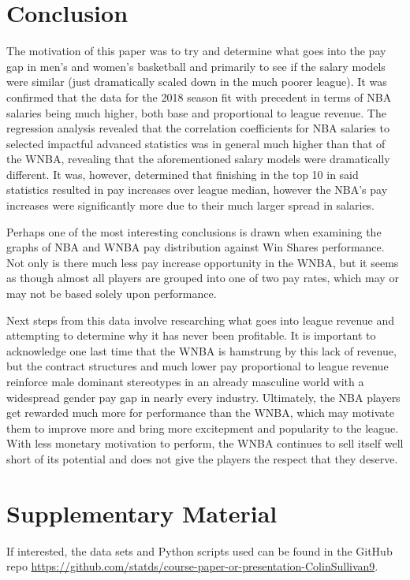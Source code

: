 \documentclass[12pt]{article}
\begin{document}
\section{Conclusion}
The motivation of this paper was to try and determine what goes into the pay gap in men’s and women’s basketball and primarily to see if the salary 
models were similar (just dramatically scaled down in the much poorer league). It was confirmed that the data for the 2018 season fit with precedent 
in terms of NBA salaries being much higher, both base and proportional to league revenue. The regression analysis revealed that the correlation 
coefficients for NBA salaries to selected impactful advanced statistics was in general much higher than that of the WNBA, revealing that the 
aforementioned salary models were dramatically different. It was, however, determined that finishing in the top 10 in said statistics resulted in pay 
increases over league median, however the NBA’s pay increases were significantly more due to their much larger spread in salaries. 
\par
Perhaps one of the most interesting conclusions is drawn when examining the graphs of NBA and WNBA pay distribution against Win Shares performance. 
Not only is there much less pay increase opportunity in the WNBA, but it seems as though almost all players are grouped into one of two pay rates, 
which may or may not be based solely upon performance.
\par
Next steps from this data involve researching what goes into league revenue and attempting to determine why it has never been profitable. 
It is important to acknowledge one last time that the WNBA is hamstrung by this lack of revenue, but the contract structures and much lower 
pay proportional to league revenue reinforce male dominant stereotypes in an already masculine world with a widespread gender pay gap in nearly
every industry. Ultimately, the NBA players get rewarded much more for performance than the WNBA, which may motivate them to improve more and bring 
more excitepment and popularity to the league. With less monetary motivation to perform, the WNBA continues to sell itself well short of its potential 
and does not give the players the respect that they deserve. 

\section{Supplementary Material}
If interested, the data sets and Python scripts used can be found in the GitHub repo \url{https://github.com/statds/course-paper-or-presentation-ColinSullivan9}.



\end{document}
